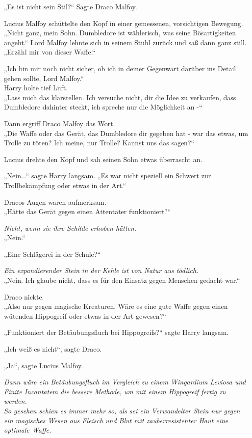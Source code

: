 {„Es ist nicht sein Stil?“ Sagte Draco Malfoy.

Lucius Malfoy schüttelte den Kopf in einer gemessenen, vorsichtigen Bewegung. „Nicht ganz, mein Sohn. Dumbledore ist wählerisch, was seine Bösartigkeiten angeht.“ Lord Malfoy lehnte sich in seinem Stuhl zurück und saß dann ganz still. „Erzähl mir von dieser Waffe.“

„Ich bin mir noch nicht sicher, ob ich in deiner Gegenwart darüber ins Detail gehen sollte, Lord Malfoy.“\\ Harry holte tief Luft.\\ „Lass mich das klarstellen. Ich versuche nicht, dir die Idee zu verkaufen, dass Dumbledore dahinter steckt, ich spreche nur die Möglichkeit an -“

Dann ergriff Draco Malfoy das Wort.\\ „Die Waffe oder das Gerät, das Dumbledore dir gegeben hat - war das etwas, um Trolle zu töten? Ich meine, nur Trolle? Kannst uns das sagen?“

Lucius drehte den Kopf und sah seinen Sohn etwas überrascht an.

„Nein...“ sagte Harry langsam. „Es war nicht speziell ein Schwert zur Trollbekämpfung oder etwas in der Art.“

Dracos Augen waren aufmerksam.\\ „Hätte das Gerät gegen einen Attentäter funktioniert?“

\emph{Nicht, wenn sie ihre Schilde erhoben hätten.}\\ „Nein.“

„Eine Schlägerei in der Schule?“

\emph{Ein expandierender Stein in der Kehle ist von Natur aus tödlich.}\\ „Nein. Ich glaube nicht, dass es für den Einsatz gegen Menschen gedacht war.“

Draco nickte.\\ „Also nur gegen magische Kreaturen. Wäre es eine gute Waffe gegen einen wütenden Hippogreif oder etwas in der Art gewesen?“

„Funktioniert der Betäubungsfluch bei Hippogreifs?“ sagte Harry langsam.

„Ich weiß es nicht“, sagte Draco.

„Ja“, sagte Lucius Malfoy.

\emph{Dann wäre ein Betäubungsfluch im Vergleich zu einem Wingardium Leviosa und Finite Incantatem die bessere Methode, um mit einem Hippogreif fertig zu werden.}\\ \emph{So gesehen schien es immer mehr so, als sei ein Verwandelter Stein nur gegen ein magisches Wesen aus Fleisch und Blut mit zauberresistenter Haut eine optimale Waffe.}

}

